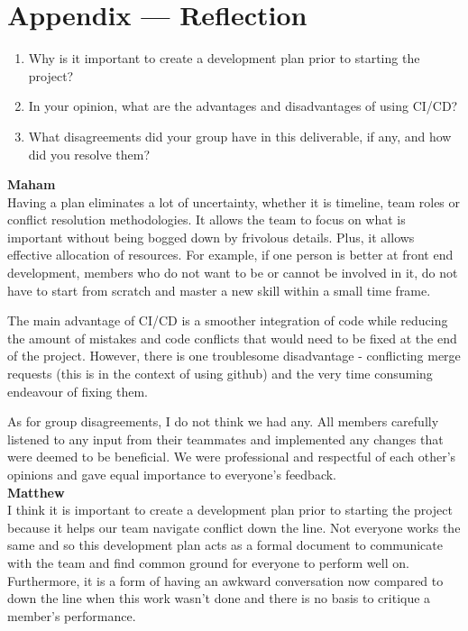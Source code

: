 \documentclass{article}
\begin{document}
\newpage{}

\section*{Appendix --- Reflection}



\begin{enumerate}
    \item Why is it important to create a development plan prior to starting the
    project?
    \item In your opinion, what are the advantages and disadvantages of using
    CI/CD?
    \item What disagreements did your group have in this deliverable, if any,
    and how did you resolve them?
\end{enumerate}
\textbf{Maham} \\
Having a plan eliminates a lot of uncertainty, whether it is timeline, team roles or conflict resolution methodologies. It allows the team to focus on what is important without being bogged down by frivolous details. Plus, it allows effective allocation of resources. For example, if one person is better at front end development, members who do not want to be or cannot be involved in it, do not have to start from scratch and master a new skill within a small time frame. 

The main advantage of CI/CD is a smoother integration of code while reducing the amount of mistakes and code conflicts that would need to be fixed at the end of the project. However, there is one troublesome disadvantage - conflicting merge requests (this is in the context of using github) and the very time consuming endeavour of fixing them. 

As for group disagreements, I do not think we had any. All members carefully listened to any input from their teammates and implemented any changes that were deemed to be beneficial. We were professional and respectful of each other’s opinions and gave equal importance to everyone’s feedback. \\


\textbf{Matthew}\\
I think it is important to create a development plan prior to starting the project because it helps our team navigate conflict down the line. Not everyone works the same and so this development plan acts as a formal document to communicate with the team and find common ground for everyone to perform well on. Furthermore, it is a form of having an awkward conversation now compared to down the line when this work wasn't done and there is no basis to critique a member's performance. 
\end{document}
